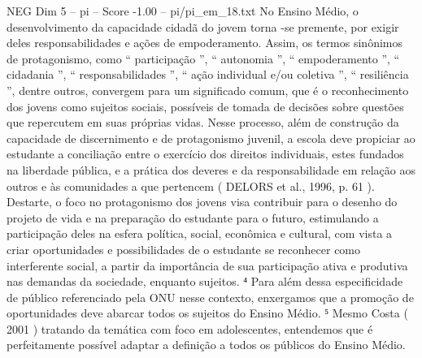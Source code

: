 \begin{textsample}{NEG Dim 5 – pi – Score -1.00 – pi/pi\_em\_18.txt}
No Ensino Médio, o desenvolvimento da capacidade cidadã do jovem torna -se premente, por exigir deles responsabilidades e ações de empoderamento.
Assim, os termos sinônimos de protagonismo, como “ participação ”, “ autonomia ”, “ empoderamento ”, “ cidadania ”, “ responsabilidades ”, “ ação individual e/ou coletiva ”, “ resiliência ”, dentre outros, convergem para um significado comum, que é o reconhecimento dos jovens como sujeitos sociais, possíveis de tomada de decisões sobre questões que repercutem em suas próprias vidas.
Nesse processo, além de construção da capacidade de discernimento e de protagonismo juvenil, a escola deve propiciar ao estudante a conciliação entre o exercício dos direitos individuais, estes fundados na liberdade pública, e a prática dos deveres e da responsabilidade em relação aos outros e às comunidades a que pertencem ( DELORS et al., 1996, p. 61 ).
Destarte, o foco no protagonismo dos jovens visa contribuir para o desenho do projeto de vida e na preparação do estudante para o futuro, estimulando a participação deles na esfera política, social, econômica e cultural, com vista a criar oportunidades e possibilidades de o estudante se reconhecer como interferente social, a partir da importância de sua participação ativa e produtiva nas demandas da sociedade, enquanto sujeitos. ⁴ Para além dessa especificidade de público referenciado pela ONU nesse contexto, enxergamos que a promoção de oportunidades deve abarcar todos os sujeitos do Ensino Médio. ⁵ Mesmo Costa ( 2001 ) tratando da temática com foco em adolescentes, entendemos que é perfeitamente possível adaptar a definição a todos os públicos do Ensino Médio.

\end{textsample}
